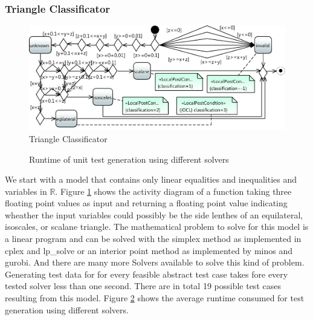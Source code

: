 \subsubsection{Triangle Classificator}
\begin{figure}
\includegraphics[width=\textwidth]{./pics/TriangleLIN.pdf}
\caption{Triangle Classificator}
\label{fig:TriangleLin}
\end{figure}
\begin{figure}
\caption{Runtime of unit test generation using different solvers}
\label{fig:TriangleLinRuntime}
\end{figure}
We start with a model that contains only linear equalities and inequalities and variables in $\mathbb{R}$. Figure \ref{fig:TriangleLin} shows the activity diagram of a function taking three floating point values as input and returning a floating point value indicating wheather the input variables could possibly be the side lenthes of an equilateral, isoscales, or scalane triangle. The mathematical problem to solve for this model is a linear program and can be solved with the simplex method as implemented in cplex and lp\_solve or an interior point method as implemented by minos and gurobi. And there are many more Solvers available to solve this kind of problem. Generating test data for for every feasible abstract test case takes fore every tested solver less than one second. There are in total 19 possible test cases resulting from this model. Figure \ref{fig:TriangleLinRuntime} shows the average runtime consumed for test generation using different solvers.
